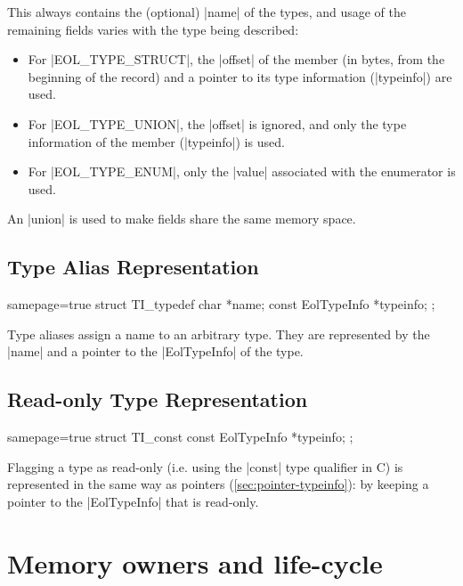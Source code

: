 \noindent
This always contains the (optional) \Mc|name| of the types, and usage of the
remaining fields varies with the type being described:

\begin{itemize}
  \item For \Mc|EOL_TYPE_STRUCT|, the \Mc|offset| of the member (in bytes,
    from the beginning of the record) and a pointer to its type information
    (\Mc|typeinfo|) are used.
  \item For \Mc|EOL_TYPE_UNION|, the \Mc|offset| is ignored, and only the
    type information of the member (\Mc|typeinfo|) is used.
  \item For \Mc|EOL_TYPE_ENUM|, only the \Mc|value| associated with the
    enumerator is used.
\end{itemize}

\noindent
An \Mc|union| is used to make fields share the same memory space.


\subsection{Type Alias Representation}

\begin{ccode*}{samepage=true}
  struct TI_typedef {
    char              *name;
    const EolTypeInfo *typeinfo;
  };
\end{ccode*}

Type aliases assign a name to an arbitrary type. They are represented by the
\Mc|name| and a pointer to the \Mc|EolTypeInfo| of the type.


\subsection{Read-only Type Representation}

\begin{ccode*}{samepage=true}
  struct TI_const {
    const EolTypeInfo *typeinfo;
  };
\end{ccode*}

\noindent
Flagging a type as read-only (i.e. using the \Mc|const| type qualifier in C)
is represented in the same way as pointers (\autoref{sec:pointer-typeinfo}):
by keeping a pointer to the \Mc|EolTypeInfo| that is read-only.


\section{Memory owners and life-cycle}

